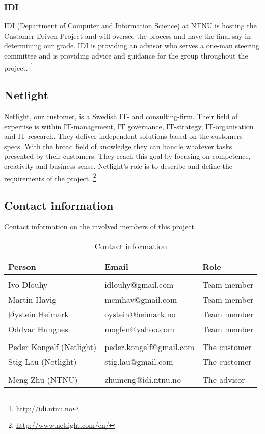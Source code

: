 \subsubsection{IDI}
IDI (Department of Computer and Information Science) at NTNU is hosting the Customer Driven Project and will oversee the process and have the final say in determining our grade. IDI is providing an advisor who serves a one-man steering committee and is providing advice and guidance for the group throughout the project.
\footnote{\url{http://idi.ntnu.no}}

\subsection{Netlight}
Netlight, our customer, is a Swedish IT- and consulting-firm. Their field of expertise is within IT-management, IT governance, IT-strategy, IT-organisation and IT-research. They deliver independent solutions based on the customers specs. With the broad field of knowledge they can handle whatever tasks presented by their customers. They reach this goal by focusing on competence, creativity and business sense. Netlight's role is to describe and define the requirements of the project.
\footnote{\url{http://www.netlight.com/en/}}

\subsection{Contact information}
Contact information on the involved members of this project.
\begin{table}
\centering
\caption{Contact information}
\begin{tabular}{ l  l  l  }
 \textbf{Person} & \textbf{Email} & \textbf{Role} \\ 
\hline \\[-2.0ex]
 Ivo Dlouhy & idlouhy@gmail.com & Team member \\
 Martin Havig & mcmhav@gmail.com & Team member \\
 Øystein Heimark & oystein@heimark.no & Team member \\
 Oddvar Hungnes & mogfen@yahoo.com & Team member \\ 
\hline \\[-2.0ex]
 Peder Kongelf (Netlight) & peder.kongelf@gmail.com & The customer \\
 Stig Lau (Netlight) & stig.lau@gmail.com & The customer \\ 
\hline \\[-2.0ex]
  Meng Zhu (NTNU) & zhumeng@idi.ntnu.no & The advisor \\ 
\hline
\end{tabular}
\end{table}


